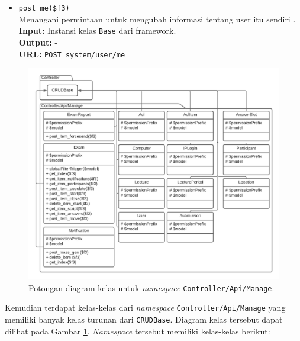 \begin{itemize}
\begin{itemize}
                \item \texttt{post\_me(\$f3)}\\
                    Menangani permintaan untuk mengubah informasi tentang user
                    itu sendiri .\\
                    \textbf{Input:} Instansi kelas \texttt{Base} dari
                    framework.\\
                    \textbf{Output:} -\\
                    \textbf{URL:} \texttt{POST system/user/me}
                    
            \end{itemize}
    \end{itemize}
    
    \begin{figure}
        \centering
        \includegraphics{Gambar/classmap-be/Classmap - app-controller-api-manage.pdf}
        \caption{Potongan diagram kelas untuk \textit{namespace}
        \texttt{Controller/Api/Manage}.}
        \label{fig:classmap_app-controller-api-manage}
    \end{figure}
    Kemudian terdapat kelas-kelas dari \textit{namespace}
    \texttt{Controller/Api/Manage} yang memiliki banyak kelas turunan dari
    \texttt{CRUDBase}. Diagram kelas tersebut dapat dilihat pada Gambar
    \ref{fig:classmap_app-controller-api-manage}. \textit{Namespace} tersebut
    memiliki kelas-kelas berikut:
